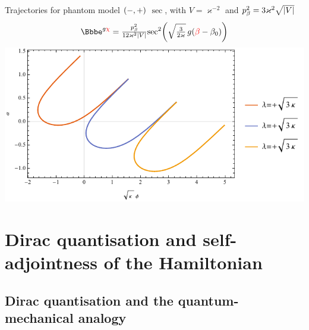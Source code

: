 \documentclass[8pt]{beamer}
\begin{document}
\begin{frame}%
{Trajectories for phantom model ${\left(-,+\right)}$}%
{$\sec$, with $V = \varkappa^{-2}$ and
$p_\beta^2 = 3\varkappa^2\sqrt{{\left|V\right|}}$}
\begin{align}
\ee^{g\textcolor{red}{\chi}} = 
\tfrac{p_\beta^2}{12\varkappa^2\vbr{V}}
\rfun{\sec^2}{ \sqrt{\tfrac{3}{2\varkappa}}\,g 
\rbr{\textcolor{red}{\beta}-\beta_0}}
\end{align}
\includegraphics[width=\textwidth]{../plots.nb/csc_lamb_l.pdf}

\end{frame}

\section{Dirac quantisation and self-adjointness of the Hamiltonian}

\subsection{Dirac quantisation and the quantum-mechanical analogy}
\end{document}
